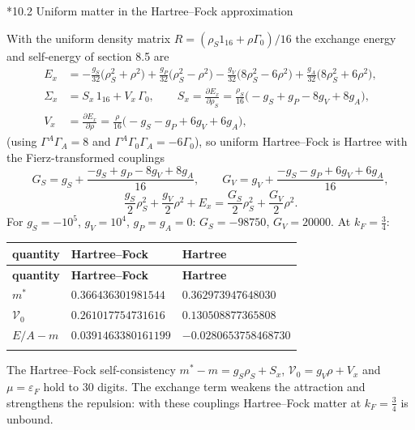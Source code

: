 \documentclass[10pt,a4paper]{article}
\makeatletter
\renewcommand\subsection{\@startsection{subsection}{2}{\z@}{-3.25ex\@plus -1ex \@minus -.2ex}{1.5ex \@plus .2ex}{\normalfont\large\bfseries\raggedright}}
\makeatother
\begin{document}
\subsection*{10.2 Uniform matter in the Hartree–Fock approximation}
With the uniform density matrix $R=(\rho_S1_{16}+\rho\Gamma_0)/16$ the exchange energy and self-energy of section 8.5 are
\begin{align*}
E_x&=-\frac{g_S}{32}\big(\rho_S^2+\rho^2\big)+\frac{g_P}{32}\big(\rho_S^2-\rho^2\big)-\frac{g_V}{32}\big(8\rho_S^2-6\rho^2\big)+\frac{g_A}{32}\big(8\rho_S^2+6\rho^2\big), \\
\Sigma_x&=S_x\,1_{16}+V_x\,\Gamma_0,\qquad S_x=\frac{\partial E_x}{\partial\rho_S}=\frac{\rho_S}{16}\big(-g_S+g_P-8g_V+8g_A\big), \\
V_x&=\frac{\partial E_x}{\partial\rho}=\frac{\rho}{16}\big(-g_S-g_P+6g_V+6g_A\big),
\end{align*}
(using $\Gamma^A\Gamma_A=8$ and $\Gamma^A\Gamma_0\Gamma_A=-6\Gamma_0$), so uniform Hartree–Fock is Hartree with the Fierz-transformed couplings
\begin{equation*}
G_S=g_S+\frac{-g_S+g_P-8g_V+8g_A}{16},\qquad G_V=g_V+\frac{-g_S-g_P+6g_V+6g_A}{16},
\end{equation*}
\begin{equation*}
\frac{g_S}{2}\rho_S^2+\frac{g_V}{2}\rho^2+E_x=\frac{G_S}{2}\rho_S^2+\frac{G_V}{2}\rho^2 .
\end{equation*}
For $g_S=-10^5$, $g_V=10^4$, $g_P=g_A=0$: $G_S=-98750$, $G_V=20000$. At $k_F=\tfrac34$:

{\small
\begin{longtable}{>{\raggedright\arraybackslash}p{}>{\raggedright\arraybackslash}p{}>{\raggedright\arraybackslash}p{}}
\toprule
\textbf{quantity} & \textbf{Hartree–Fock} & \textbf{Hartree} \\
\midrule\endfirsthead
\toprule
\textbf{quantity} & \textbf{Hartree–Fock} & \textbf{Hartree} \\
\midrule\endhead
\endfoot
\bottomrule\endlastfoot
$m^*$ & $0.366436301981544$ & $0.362973947648030$ \\
$\mathcal V_0$ & $0.261017754731616$ & $0.130508877365808$ \\
$E/A-m$ & $0.0391463380161199$ & $-0.0280653758468730$ \\*
\end{longtable}}
The Hartree–Fock self-consistency $m^*-m=g_S\rho_S+S_x$, $\mathcal V_0=g_V\rho+V_x$ and $\mu=\varepsilon_F$ hold to 30 digits. The exchange term weakens the attraction and strengthens the repulsion: with these couplings Hartree–Fock matter at $k_F=\frac34$ is unbound.
\end{document}

